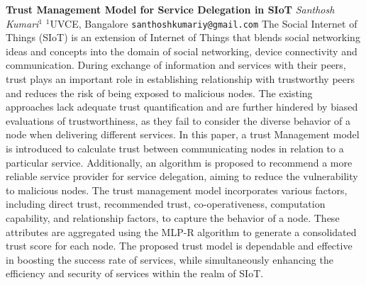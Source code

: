 
    \begin{conf-abstract}[]
        {\textbf{Trust Management Model for Service Delegation in SIoT}}
        {\textit{Santhosh Kumari$^{1}$}}
        {$^{1}$UVCE, Bangalore}
        {\texttt{santhoshkumariy@gmail.com}}
        {The Social Internet of Things (SIoT) is an extension of Internet of Things that blends social networking ideas and concepts into the domain of social networking, device connectivity and communication. During exchange of information and services with their peers, trust plays an important role in establishing relationship with trustworthy peers and reduces the risk of being exposed to malicious nodes. The existing approaches lack adequate trust quantification and are further hindered by biased evaluations of trustworthiness, as they fail to consider the diverse behavior of a node when delivering different services. In this paper, a trust Management model is introduced to calculate trust between communicating nodes in relation to a particular service. Additionally, an algorithm is proposed to recommend a more reliable service provider for service delegation, aiming to reduce the vulnerability to malicious nodes. The trust management model incorporates various factors, including direct trust, recommended trust, co-operativeness, computation capability, and relationship factors, to capture the behavior of a node. These attributes are aggregated using the MLP-R algorithm to generate a consolidated trust score for each node. The proposed trust model is dependable and effective in boosting the success rate of services, while simultaneously enhancing the efficiency and security of services within the realm of SIoT.}
    \end{conf-abstract}
        